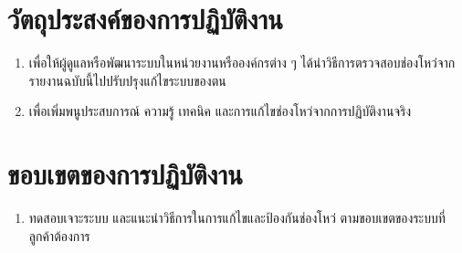 \newpage
\section{วัตถุประสงค์ของการปฏิบัติงาน}
\begin{enumerate}
	\item เพื่อให้ผู้ดูแลหรือพัฒนาระบบในหน่วยงานหรือองค์กรต่าง ๆ ได้นำวิธีการตรวจสอบช่องโหว่จากรายงานฉบับนี้ไปปรับปรุงแก้ไขระบบของตน
	\item เพื่อเพิ่มพนูประสบการณ์ ความรู้ เทคนิค และการแก้ไขช่องโหว่จากการปฏิบัติงานจริง
\end{enumerate}

\section{ขอบเขตของการปฏิบัติงาน}
\begin{enumerate}
    \item ทดสอบเจาะระบบ และแนะนำวิธีการในการแก้ไขและป้องกันช่องโหว่ ตามขอบเขตของระบบที่ลูกค้าต้องการ
\end{enumerate}

